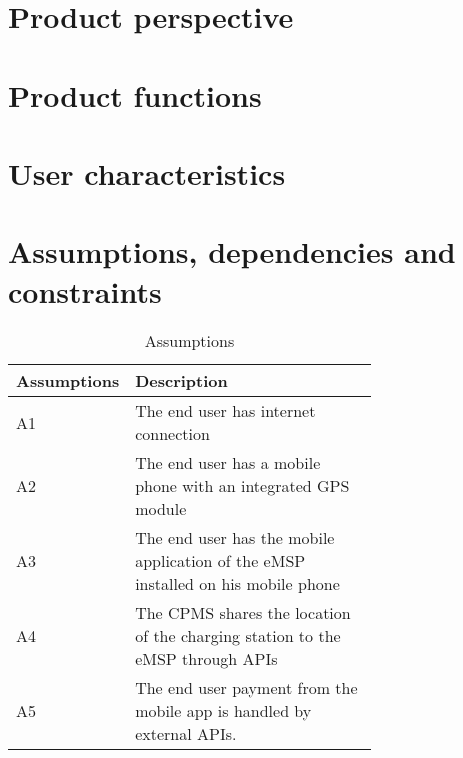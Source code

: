 \section{Product perspective}
\label{sec:product_perspective}%

\section{Product functions}
\label{sec:Product functions}%

\section{User characteristics}
\label{sec:User_characteristics}%

\section{Assumptions, dependencies and constraints}
\label{sec:Assumptions, dependencies and constraints}%
\begin{table}[h!]
    \centering
    \begin{tabular}{|l|p{0.725\linewidth}|}
     \hline
     \textbf{Assumptions} & \textbf{Description} \\
     \hline
     A1 & The end user has internet connection \\
     \hline
     A2 & The end user has a mobile phone with an integrated GPS module \\
     \hline
     A3 & The end user has the mobile application of the eMSP installed on his mobile phone \\
     \hline
     A4 & The CPMS shares the location of the charging station to the eMSP through APIs\\
     \hline
     A5 & The end user payment from the mobile app is handled by external APIs.\\
     \hline
     
\end{tabular}
    \caption{Assumptions}
    \label{tab:Assumptions}
\end{table}